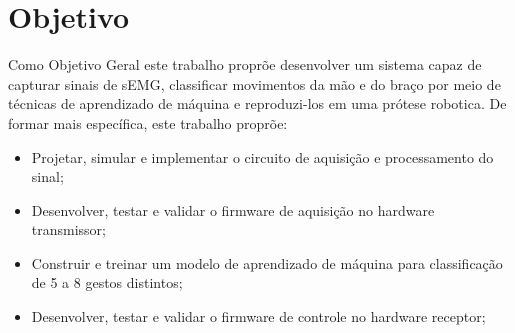 \section{Objetivo}

Como Objetivo Geral este trabalho proprõe desenvolver um sistema capaz de capturar sinais de sEMG, classificar movimentos da mão e do braço por meio de técnicas de aprendizado de máquina e reproduzi-los em uma prótese robotica. De formar mais específica, este trabalho proprõe:
\begin{itemize}
    \item Projetar, simular e implementar o circuito de aquisição e processamento do sinal;
    \item Desenvolver, testar e validar o firmware de aquisição no hardware transmissor;
    \item Construir e treinar um modelo de aprendizado de máquina para classificação de 5 a 8 gestos distintos;
    \item Desenvolver, testar e validar o firmware de controle no hardware receptor;
\end{itemize}
